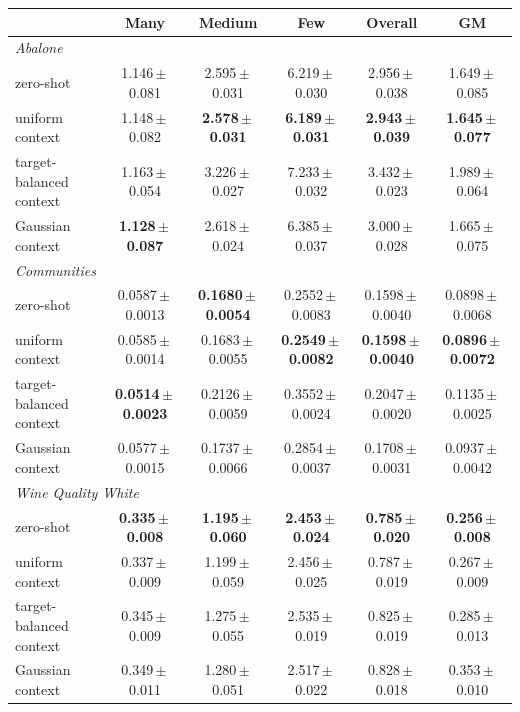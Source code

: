 \begin{tabular}{lccccc}
\toprule
& Many & Medium & Few & Overall & GM \\
\midrule
\multicolumn{6}{l}{\textit{Abalone}} \\
zero-shot & 1.146\,$\pm$\,0.081 & 2.595\,$\pm$\,0.031 & 6.219\,$\pm$\,0.030 & 2.956\,$\pm$\,0.038 & 1.649\,$\pm$\,0.085 \\
uniform context & 1.148\,$\pm$\,0.082 & \textbf{2.578\,$\pm$\,0.031} & \textbf{6.189\,$\pm$\,0.031} & \textbf{2.943\,$\pm$\,0.039} & \textbf{1.645\,$\pm$\,0.077} \\
target-balanced context & 1.163\,$\pm$\,0.054 & 3.226\,$\pm$\,0.027 & 7.233\,$\pm$\,0.032 & 3.432\,$\pm$\,0.023 & 1.989\,$\pm$\,0.064 \\
Gaussian context & \textbf{1.128\,$\pm$\,0.087} & 2.618\,$\pm$\,0.024 & 6.385\,$\pm$\,0.037 & 3.000\,$\pm$\,0.028 & 1.665\,$\pm$\,0.075 \\
\midrule
\multicolumn{6}{l}{\textit{Communities}} \\
zero-shot & 0.0587\,$\pm$\,0.0013 & \textbf{0.1680\,$\pm$\,0.0054} & 0.2552\,$\pm$\,0.0083 & 0.1598\,$\pm$\,0.0040 & 0.0898\,$\pm$\,0.0068 \\
uniform context & 0.0585\,$\pm$\,0.0014 & 0.1683\,$\pm$\,0.0055 & \textbf{0.2549\,$\pm$\,0.0082} & \textbf{0.1598\,$\pm$\,0.0040} & \textbf{0.0896\,$\pm$\,0.0072} \\
target-balanced context & \textbf{0.0514\,$\pm$\,0.0023} & 0.2126\,$\pm$\,0.0059 & 0.3552\,$\pm$\,0.0024 & 0.2047\,$\pm$\,0.0020 & 0.1135\,$\pm$\,0.0025 \\
Gaussian context & 0.0577\,$\pm$\,0.0015 & 0.1737\,$\pm$\,0.0066 & 0.2854\,$\pm$\,0.0037 & 0.1708\,$\pm$\,0.0031 & 0.0937\,$\pm$\,0.0042 \\
\midrule
\multicolumn{6}{l}{\textit{Wine Quality White}} \\
zero-shot & \textbf{0.335\,$\pm$\,0.008} & \textbf{1.195\,$\pm$\,0.060} & \textbf{2.453\,$\pm$\,0.024} & \textbf{0.785\,$\pm$\,0.020} & \textbf{0.256\,$\pm$\,0.008} \\
uniform context & 0.337\,$\pm$\,0.009 & 1.199\,$\pm$\,0.059 & 2.456\,$\pm$\,0.025 & 0.787\,$\pm$\,0.019 & 0.267\,$\pm$\,0.009 \\
target-balanced context & 0.345\,$\pm$\,0.009 & 1.275\,$\pm$\,0.055 & 2.535\,$\pm$\,0.019 & 0.825\,$\pm$\,0.019 & 0.285\,$\pm$\,0.013 \\
Gaussian context & 0.349\,$\pm$\,0.011 & 1.280\,$\pm$\,0.051 & 2.517\,$\pm$\,0.022 & 0.828\,$\pm$\,0.018 & 0.353\,$\pm$\,0.010 \\
\bottomrule
\end{tabular}
